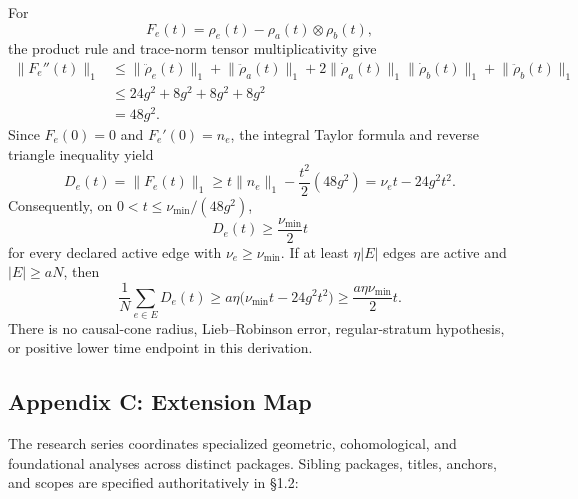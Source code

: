 \documentclass[
  11pt,
]{article}
\begin{document}
For
\[
F_e(t)=\rho_e(t)-\rho_a(t)\otimes\rho_b(t),
\]
the product rule and trace-norm tensor multiplicativity give
\[
\begin{aligned}
\lVert F_e''(t)\rVert_1
&\le
\lVert\ddot\rho_e(t)\rVert_1
+\lVert\ddot\rho_a(t)\rVert_1
+2\lVert\dot\rho_a(t)\rVert_1\lVert\dot\rho_b(t)\rVert_1
+\lVert\ddot\rho_b(t)\rVert_1\\
&\le24g^2+8g^2+8g^2+8g^2\\
&=48g^2.
\end{aligned}
\]
Since \(F_e(0)=0\) and \(F_e'(0)=n_e\), the integral Taylor formula and reverse triangle inequality yield
\[
D_e(t)=\lVert F_e(t)\rVert_1
\ge t\lVert n_e\rVert_1-\frac{t^2}{2}(48g^2)
=\nu_et-24g^2t^2.
\]
Consequently, on \(0<t\le\nu_{\min}/(48g^2)\),
\[
D_e(t)\ge\frac{\nu_{\min}}2t
\]
for every declared active edge with \(\nu_e\ge\nu_{\min}\). If at least \(\eta\lvert E\rvert\) edges are active and \(\lvert E\rvert\ge aN\), then
\[
\frac1N\sum_{e\in E}D_e(t)
\ge
a\eta\bigl(\nu_{\min}t-24g^2t^2\bigr)
\ge
\frac{a\eta\nu_{\min}}2t.
\]
There is no causal-cone radius, Lieb--Robinson error, regular-stratum hypothesis, or positive lower time endpoint in this derivation.

\subsection{Appendix C: Extension Map}\label{appendix-c-extension-map}

The research series coordinates specialized geometric, cohomological, and foundational analyses across distinct packages. Sibling packages, titles, anchors, and scopes are specified authoritatively in §1.2:
\end{document}
